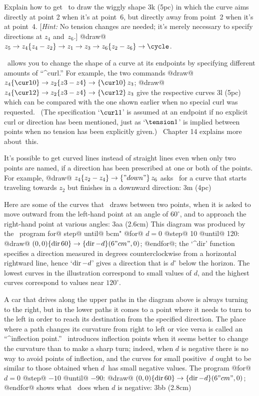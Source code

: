 \exercise Explain how to get \MF\ to draw the wiggly shape
\displayfig 3k (5pc)
in which the curve aims directly at point 2 when it's at point~6, but
directly away from point~2 when it's at point~4. [{\sl Hint:\/} No
tension changes are needed; it's merely necessary to specify directions
at $z_4$ and~$z_6$.]
\answer @draw@ $z_5\to z_4\{z_4-z_2\}\to z_1\to z_3\to z_6\{z_2-z_6\}
\to\cycle$.

\MF\ allows you to change the shape of a curve at its endpoints by
specifying different amounts of ``^{curl}.'' For example, the two commands
\begindisplay
@draw@ $z_4\{\curl0\}\to z_2\{z3-z4\}\to\{\curl0\}\,z_3$;\cr
@draw@ $z_4\{\curl2\}\to z_2\{z3-z4\}\to\{\curl2\}\,z_3$\cr
\enddisplay
give the respective curves
\displayfig 3l (5pc)
which can be compared with the one shown earlier when no special curl was
requested. \ (The specification `$\curl1$' is assumed at an endpoint
if no explicit curl or direction has been mentioned, just as
`$\tension1$' is implied between points when no tension has
been explicitly given.) \ Chapter 14 explains more about~this.

It's possible to get curved lines instead of straight lines even when
only two points are named, if a direction has been prescribed at one or
both of the points. For example,
\begindisplay
@draw@ $z_4\{z_2-z_4\}\to\{"down"\}\,z_6$\cr
\enddisplay
asks \MF\ for a curve that starts traveling towards $z_2$ but finishes
in a downward direction:
\displayfig 3m (4pc)

\danger Here are some of the curves that \MF\ draws between two points, when
it is asked to move outward from the left-hand point at an angle of
$60^\circ$, and to approach the right-hand point at various angles:
\displayfig 3aa (2.6cm)
This diagram was produced by the \MF\ program ^^@for@ ^^@step@ ^^@until@ ^^"cm"
\begindisplay
@for@ $d=0$ @step@ 10 @until@ 120:\cr
\indent @draw@ $(0,0)\{{\rm dir}\,60\}\to\{{\rm dir}\,{-d}\}(6"cm",0)$;
 @endfor@;\cr
\enddisplay
the `^{dir}' function specifies a direction measured in degrees
counterclockwise from a horizontal rightward line, hence `${\rm dir}\,{-d}$'
gives a direction that is $d^\circ$ below the horizon.  The lowest curves
in the illustration correspond to small values of $d$, and the highest
curves correspond to values near $120^\circ$.

\danger A car that drives along the upper paths in the diagram above
is always turning to the right, but in the lower paths it comes to a
point where it needs to turn to the left in order to reach its destination
from the specified direction.
The place where a path changes its curvature from right to left or
vice versa is called an ``^{inflection point}.'' \MF\ introduces
inflection points when it seems better to change the curvature than
to make a sharp turn; indeed, when $d$ is negative there is no way to
avoid points of inflection, and the curves for small positive~$d$ ought to
be similar to those obtained when $d$~has small negative values. The program
\begindisplay
@for@ $d=0$ @step@ $-10$ @until@ $-90$:\cr
\indent @draw@ $(0,0)\{{\rm dir}\,60\}\to\{{\rm dir}\,{-d}\}(6"cm",0)$;
 @endfor@\cr
\enddisplay
shows what \MF\ does when $d$ is negative:
\displayfig 3bb (2.8cm)

